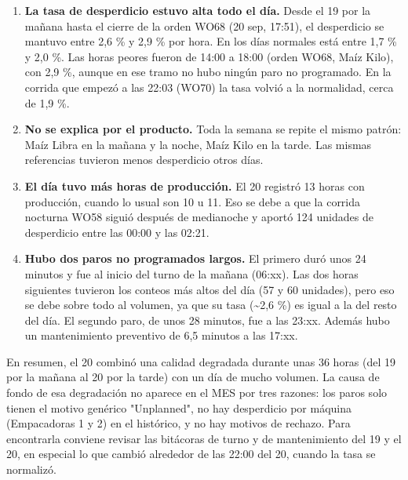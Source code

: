 \begin{singlespace}
{\begin{enumerate}[leftmargin=1.5em,itemsep=0pt,topsep=2pt]
\item \textbf{La tasa de desperdicio estuvo alta todo el día.} Desde el 19 por la mañana hasta el cierre de la orden WO68 (20 sep, 17:51), el desperdicio se mantuvo entre 2,6 \% y 2,9 \% por hora. En los días normales está entre 1,7 \% y 2,0 \%. Las horas peores fueron de 14:00 a 18:00 (orden WO68, Maíz Kilo), con 2,9 \%, aunque en ese tramo no hubo ningún paro no programado. En la corrida que empezó a las 22:03 (WO70) la tasa volvió a la normalidad, cerca de 1,9 \%.
\item \textbf{No se explica por el producto.} Toda la semana se repite el mismo patrón: Maíz Libra en la mañana y la noche, Maíz Kilo en la tarde. Las mismas referencias tuvieron menos desperdicio otros días.
\item \textbf{El día tuvo más horas de producción.} El 20 registró 13 horas con producción, cuando lo usual son 10 u 11. Eso se debe a que la corrida nocturna WO58 siguió después de medianoche y aportó 124 unidades de desperdicio entre las 00:00 y las 02:21.
\item \textbf{Hubo dos paros no programados largos.} El primero duró unos 24 minutos y fue al inicio del turno de la mañana (06:xx). Las dos horas siguientes tuvieron los conteos más altos del día (57 y 60 unidades), pero eso se debe sobre todo al volumen, ya que su tasa (\textasciitilde{}2,6 \%) es igual a la del resto del día. El segundo paro, de unos 28 minutos, fue a las 23:xx. Además hubo un mantenimiento preventivo de 6,5 minutos a las 17:xx.
\end{enumerate}



En resumen, el 20 combinó una calidad degradada durante unas 36 horas (del 19 por la mañana al 20 por la tarde) con un día de mucho volumen. La causa de fondo de esa degradación no aparece en el MES por tres razones: los paros solo tienen el motivo genérico "Unplanned", no hay desperdicio por máquina (Empacadoras 1 y 2) en el histórico, y no hay motivos de rechazo. Para encontrarla conviene revisar las bitácoras de turno y de mantenimiento del 19 y el 20, en especial lo que cambió alrededor de las 22:00 del 20, cuando la tasa se normalizó.}

\end{singlespace}
